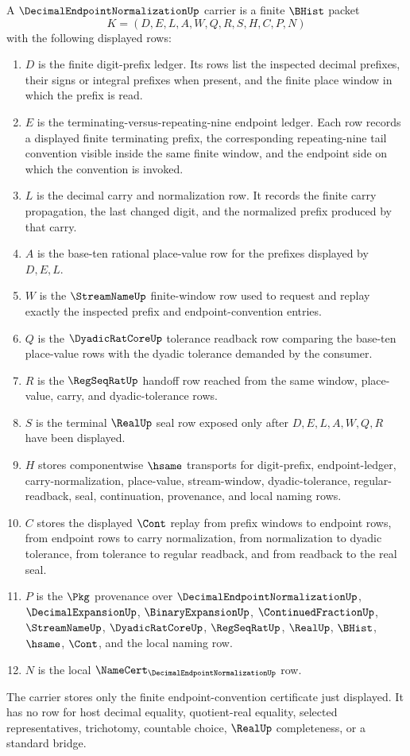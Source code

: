 \begin{definition}\label{def:decimal-endpoint-normalization-carrier}
A $\DecimalEndpointNormalizationUp$ carrier is a finite $\BHist$ packet
$$
K=(D,E,L,A,W,Q,R,S,H,C,P,N)
$$
with the following displayed rows:
\begin{enumerate}
\item $D$ is the finite digit-prefix ledger. Its rows list the inspected decimal prefixes, their signs or integral prefixes when present, and the finite place window in which the prefix is read.
\item $E$ is the terminating-versus-repeating-nine endpoint ledger. Each row records a displayed finite terminating prefix, the corresponding repeating-nine tail convention visible inside the same finite window, and the endpoint side on which the convention is invoked.
\item $L$ is the decimal carry and normalization row. It records the finite carry propagation, the last changed digit, and the normalized prefix produced by that carry.
\item $A$ is the base-ten rational place-value row for the prefixes displayed by $D,E,L$.
\item $W$ is the $\StreamNameUp$ finite-window row used to request and replay exactly the inspected prefix and endpoint-convention entries.
\item $Q$ is the $\DyadicRatCoreUp$ tolerance readback row comparing the base-ten place-value rows with the dyadic tolerance demanded by the consumer.
\item $R$ is the $\RegSeqRatUp$ handoff row reached from the same window, place-value, carry, and dyadic-tolerance rows.
\item $S$ is the terminal $\RealUp$ seal row exposed only after $D,E,L,A,W,Q,R$ have been displayed.
\item $H$ stores componentwise $\hsame$ transports for digit-prefix, endpoint-ledger, carry-normalization, place-value, stream-window, dyadic-tolerance, regular-readback, seal, continuation, provenance, and local naming rows.
\item $C$ stores the displayed $\Cont$ replay from prefix windows to endpoint rows, from endpoint rows to carry normalization, from normalization to dyadic tolerance, from tolerance to regular readback, and from readback to the real seal.
\item $P$ is the $\Pkg$ provenance over $\DecimalEndpointNormalizationUp$, $\DecimalExpansionUp$, $\BinaryExpansionUp$, $\ContinuedFractionUp$, $\StreamNameUp$, $\DyadicRatCoreUp$, $\RegSeqRatUp$, $\RealUp$, $\BHist$, $\hsame$, $\Cont$, and the local naming row.
\item $N$ is the local $\NameCert_{\DecimalEndpointNormalizationUp}$ row.
\end{enumerate}
The carrier stores only the finite endpoint-convention certificate just displayed. It has no row for host decimal equality, quotient-real equality, selected representatives, trichotomy, countable choice, $\RealUp$ completeness, or a standard bridge.
\end{definition}

